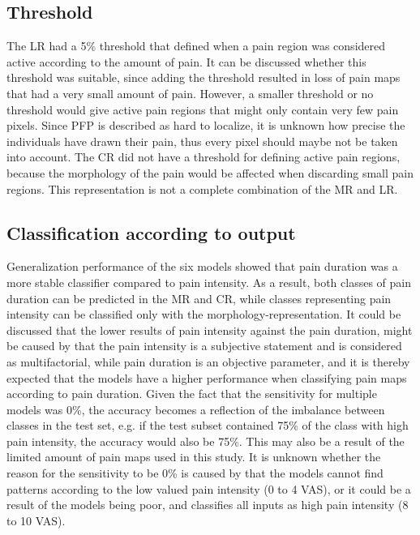 \subsection*{Threshold} 
The LR had a 5\% threshold that defined when a pain region was considered active according to the amount of pain. It can be discussed whether this threshold was suitable, since adding the threshold resulted in loss of pain maps that had a very small amount of pain. However, a smaller threshold or no threshold would give active pain regions that might only contain very few pain pixels. Since PFP is described as hard to localize, it is unknown how precise the individuals have drawn their pain, thus every pixel should maybe not be taken into account. 
The CR did not have a threshold for defining active pain regions, because the morphology of the pain would be affected when discarding small pain regions. This representation is not a complete combination of the MR and LR.

\subsection*{Classification according to output}
Generalization performance of the six models showed that pain duration was a more stable classifier compared to pain intensity. As a result, both classes of pain duration can be predicted in the MR and CR, while classes representing pain intensity can be classified only with the morphology-representation.
It could be discussed that the lower results of pain intensity against the pain duration, might be caused by that the pain intensity is a subjective statement and is considered as multifactorial, while pain duration is an objective parameter, and it is thereby expected that the models have a higher performance when classifying pain maps according to pain duration. 
Given the fact that the sensitivity for multiple models was 0\%, the accuracy becomes a reflection of the imbalance between classes in the test set, e.g. if the test subset contained 75\% of the class with high pain intensity, the accuracy would also be 75\%. This may also be a result of the limited amount of pain maps used in this study.  
It is unknown whether the reason for the sensitivity to be 0\% is caused by that the models cannot find patterns according to the low valued pain intensity (0 to 4 VAS), or it could be a result of the models being poor, and classifies all inputs as high pain intensity (8 to 10 VAS).  

